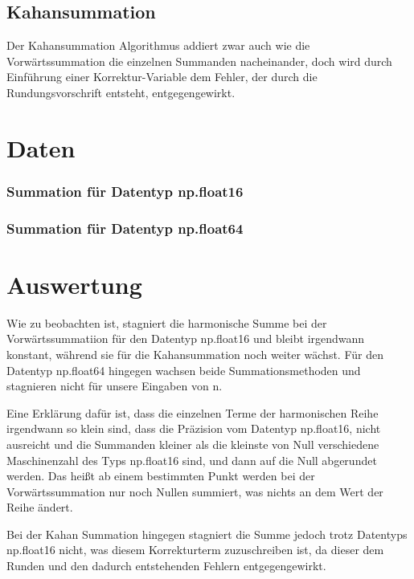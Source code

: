 \documentclass{scrreprt}
\begin{document}
\subsection{Kahansummation}
Der Kahansummation Algorithmus addiert zwar auch wie die Vorwärtssummation die einzelnen Summanden nacheinander, 
doch wird durch Einführung einer Korrektur-Variable dem Fehler, der durch die Rundungsvorschrift entsteht, entgegengewirkt.
\section{Daten}

\subsubsection{Summation für Datentyp np.float16}

\subsubsection{Summation für Datentyp np.float64}

\section{Auswertung}
Wie zu beobachten ist, stagniert die harmonische Summe bei der Vorwärtssummatiion für den Datentyp np.float16 und bleibt irgendwann konstant, 
während sie für die Kahansummation noch weiter wächst. Für den Datentyp np.float64 hingegen wachsen beide Summationsmethoden und 
stagnieren nicht für unsere Eingaben von n.

Eine Erklärung dafür ist, dass die einzelnen Terme der harmonischen Reihe irgendwann so klein sind, dass die Präzision vom Datentyp np.float16, 
nicht ausreicht und die Summanden kleiner als die kleinste von Null verschiedene Maschinenzahl des Typs np.float16 sind, 
und dann auf die Null abgerundet werden. Das heißt ab einem bestimmten Punkt werden bei der Vorwärtssummation nur noch Nullen summiert, 
was nichts an dem Wert der Reihe ändert.

Bei der Kahan Summation hingegen stagniert die Summe jedoch trotz Datentyps np.float16 nicht, was diesem Korrekturterm zuzuschreiben ist, 
da dieser dem Runden und den dadurch entstehenden Fehlern entgegengewirkt.
\end{document}
